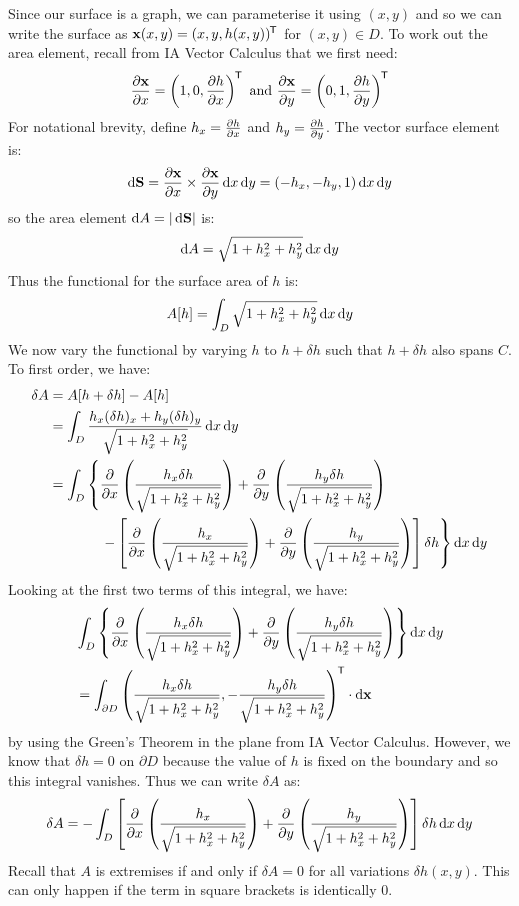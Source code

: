 \documentclass[../main.tex]{subfiles}
\begin{document}
Since our surface is a graph, we can parameterise it using $(x, y)$ and so we can write the surface as $\mathbf{\bm{x}}(x, y) = (x, y, h(x, y))^{{\mkern-1.5mu\mathsf{T}}}$ for $(x, y) \in D$.
To work out the area element, recall from IA Vector Calculus that we first need:
\[
  \pderiv{\vec{x}}{x} = \left(1, 0, \pderiv{h}{x}\right)^{\trans} \text{ and } \pderiv{\vec{x}}{y} = \left(0, 1, \pderiv{h}{y}\right)^{\trans}
\]
For notational brevity, define $h_x = \pderiv{h}{x}$ and $h_y = \pderiv{h}{y}$.
The vector surface element is:
\[
  \d{\vec{S}} = \pderiv{\vec{x}}{x} \times \pderiv{\vec{x}}{y} \d{x}\d{y} = \left(-h_x, -h_y, 1\right) \d{x}\d{y}
\]
so the area element $\d{A} = |\d{\vec{S}}|$ is:
\[
  \d{A} = \sqrt{1 + h^2_x + h^2_y} \d{x}\d{y}
\]
Thus the functional for the surface area of $h$ is:
\[
  A[h] = \int_{D} \sqrt{1 + h^2_x + h^2_y} \d{x}\d{y}
\]
We now vary the functional by varying $h$ to $h + \delta h$ such that $h + \delta h$ also spans $C$.
To first order, we have:
\begin{align*}
  \delta A &= A[h + \delta h] - A[h] \\
           &= \int_{D} \frac{h_x (\delta h)_x + h_y (\delta h)_y}{\sqrt{1 + h^2_x + h^2_y}} \d{x} \d{y} \\
           &= \int_{D} \left\{\pderiv{}{x}\left(\frac{h_x \delta h}{\sqrt{1 + h^2_x + h^2_y}}\right) + \pderiv{}{y}\left(\frac{h_y \delta h}{\sqrt{1 + h^2_x + h^2_y}}\right)\right. \\
           &\hspace{1.3cm}\left.- \left[\pderiv{}{x}\left(\frac{h_x}{\sqrt{1 + h^2_x + h^2_y}}\right) + \pderiv{}{y}\left(\frac{h_y}{\sqrt{1 + h^2_x + h^2_y}}\right)\right]\delta h\right\} \d{x} \d{y}
\end{align*}
Looking at the first two terms of this integral, we have:
\begin{align*}
  &\int_{D} \left\{\pderiv{}{x}\left(\frac{h_x \delta h}{\sqrt{1 + h^2_x + h^2_y}}\right) + \pderiv{}{y}\left(\frac{h_y \delta h}{\sqrt{1 + h^2_x + h^2_y}}\right)\right\}\d{x}\d{y} \\
  &= \int_{\partial D}  \left(\frac{h_x \delta h}{\sqrt{1 + h^2_x + h^2_y}}, -\frac{h_y \delta h}{\sqrt{1 + h^2_x + h^2_y}}\right)^{\trans} \cdot \d{\vec{\vec{x}}}
\end{align*}
by using the Green's Theorem in the plane from IA Vector Calculus.
However, we know that $\delta h = 0$ on $\partial D$ because the value of $h$ is fixed on the boundary and so this integral vanishes.
Thus we can write $\delta A$ as:
\[
  \delta A = - \int_{D} \left[\pderiv{}{x}\left(\frac{h_x}{\sqrt{1 + h^2_x + h^2_y}}\right) + \pderiv{}{y}\left(\frac{h_y}{\sqrt{1 + h^2_x + h^2_y}}\right)\right]\delta h \d{x} \d{y}
\]
Recall that $A$ is extremises if and only if $\delta A = 0$ for all variations $\delta h(x, y)$.
This can only happen if the term in square brackets is identically 0.
\end{document}
